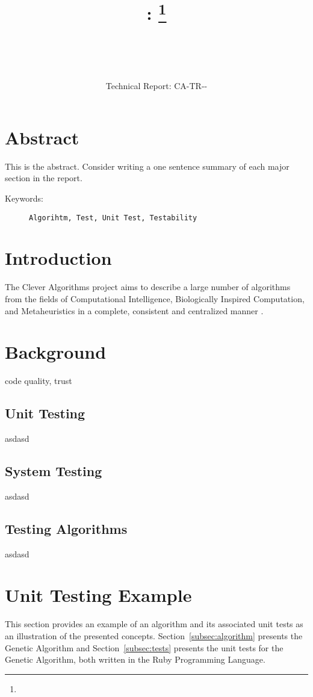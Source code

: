 \documentclass[a4paper, 11pt]{article}
\title{{\myreporttitle}: {\myreportsubtitle}\footnote{\myreportlicense}}
\author{\myreportauthor\\{\myreportemail}\\\small\myreportproject}
\date{\myreportfulldate\\{\small{Technical Report: CA-TR-{\myreportdate}-\myreportversion}}}
\begin{document}
\maketitle

\section*{Abstract} 
This is the abstract. Consider writing a one sentence summary of each major section in the report.

\begin{description}
	\item[Keywords:] {\small\texttt{Algorihtm, Test, Unit Test, Testability}}
\end{description} 

\section{Introduction}
\label{sec:introduction}
The Clever Algorithms project aims to describe a large number of algorithms from the fields of Computational Intelligence, Biologically Inspired Computation, and Metaheuristics in a complete, consistent and centralized manner \cite{Brownlee2010}.

\section{Background}
\label{sec:testing}

code quality, trust

\subsection{Unit Testing}
asdasd

\subsection{System Testing}
asdasd

\subsection{Testing Algorithms}
asdasd


\section{Unit Testing Example}
\label{sec:example}
This section provides an example of an algorithm and its associated unit tests as an illustration of the presented concepts. Section~\ref{subsec:algorithm} presents the Genetic Algorithm and Section~\ref{subsec:tests} presents the unit tests for the Genetic Algorithm, both written in the Ruby Programming Language.
\end{document}
